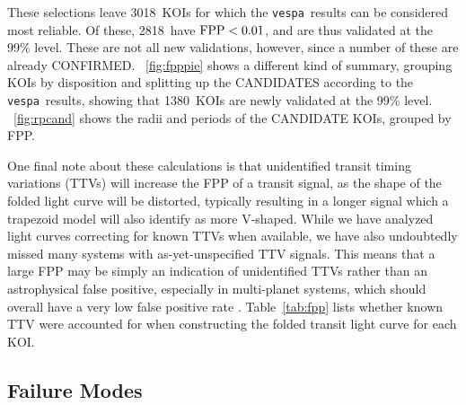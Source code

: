 \documentclass{emulateapj}
\newcommand{\figref}[1]{\ref{fig:#1}}
\newcommand{\Fig}[1]{\figurename~\figref{#1}}
\newcommand{\Tab}[1]{Table~\ref{tab:#1}}
\newcommand{\sectlabel}[1]{\label{sect:#1}}
\newcommand{\nreliable}{3018}
\newcommand{\nval}{2818}
\newcommand{\nvalnew}{1380}
\newcommand{\vespa}{\texttt{vespa}}
\begin{document}
These selections leave \nreliable\ KOIs for which the \vespa\ results
can be considered most reliable.  Of these, \nval\ have ${\rm FPP} <
0.01$, and are thus validated at the 99\% level.  These are not all
new validations, however, since a number of these are already
CONFIRMED.  \Fig{fpppie} shows a different kind of summary, grouping
KOIs by disposition and splitting up the CANDIDATES according to the
\vespa\ results, showing that \nvalnew\ KOIs are newly validated at
the 99\% level.  \Fig{rpcand} shows the radii and periods of the
CANDIDATE KOIs, grouped by FPP.

One final note about these calculations is that unidentified transit
timing variations (TTVs) will increase the FPP of a transit signal, as
the shape of the folded light curve will be distorted, typically
resulting in a longer signal which a trapezoid model will also
identify as more V-shaped.  While we have analyzed light curves
correcting for known TTVs when available, we have also undoubtedly
missed many systems with as-yet-unspecified TTV signals.  This means
that a large FPP may be simply an indication of unidentified TTVs
rather than an astrophysical false positive, especially in
multi-planet systems, which should overall have a very low false
positive rate \citep{Lissauer:2014,Rowe:2014}.  \Tab{fpp} lists
whether known TTV were accounted for when constructing the folded
transit light curve for each KOI.


\subsection{Failure Modes}
\sectlabel{failures}
\end{document}
